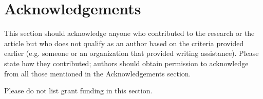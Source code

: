 \documentclass[10pt,a4paper]{article}
\begin{document}
\section*{Acknowledgements}
This section should acknowledge anyone who contributed to the research or the article but who does not qualify as an author based on the criteria provided earlier (e.g. someone or an organization that provided writing assistance). Please state how they contributed; authors should obtain permission to acknowledge from all those mentioned in the Acknowledgements section.

Please do not list grant funding in this section.

{\small
}
\end{document}
